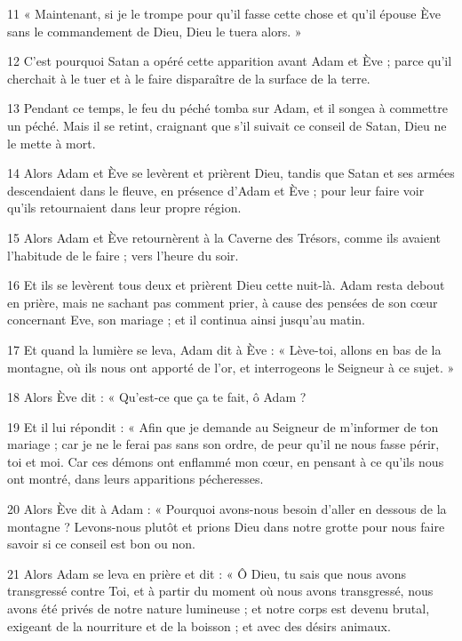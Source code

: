 \par 11 « Maintenant, si je le trompe pour qu'il fasse cette chose et qu'il épouse Ève sans le commandement de Dieu, Dieu le tuera alors. »

\par 12 C'est pourquoi Satan a opéré cette apparition avant Adam et Ève ; parce qu'il cherchait à le tuer et à le faire disparaître de la surface de la terre.

\par 13 Pendant ce temps, le feu du péché tomba sur Adam, et il songea à commettre un péché. Mais il se retint, craignant que s'il suivait ce conseil de Satan, Dieu ne le mette à mort.

\par 14 Alors Adam et Ève se levèrent et prièrent Dieu, tandis que Satan et ses armées descendaient dans le fleuve, en présence d'Adam et Ève ; pour leur faire voir qu'ils retournaient dans leur propre région.

\par 15 Alors Adam et Ève retournèrent à la Caverne des Trésors, comme ils avaient l'habitude de le faire ; vers l'heure du soir.

\par 16 Et ils se levèrent tous deux et prièrent Dieu cette nuit-là. Adam resta debout en prière, mais ne sachant pas comment prier, à cause des pensées de son cœur concernant Eve, son mariage ; et il continua ainsi jusqu'au matin.

\par 17 Et quand la lumière se leva, Adam dit à Ève : « Lève-toi, allons en bas de la montagne, où ils nous ont apporté de l'or, et interrogeons le Seigneur à ce sujet. »

\par 18 Alors Ève dit : « Qu'est-ce que ça te fait, ô Adam ?

\par 19 Et il lui répondit : « Afin que je demande au Seigneur de m'informer de ton mariage ; car je ne le ferai pas sans son ordre, de peur qu'il ne nous fasse périr, toi et moi. Car ces démons ont enflammé mon cœur, en pensant à ce qu’ils nous ont montré, dans leurs apparitions pécheresses.

\par 20 Alors Ève dit à Adam : « Pourquoi avons-nous besoin d'aller en dessous de la montagne ? Levons-nous plutôt et prions Dieu dans notre grotte pour nous faire savoir si ce conseil est bon ou non.

\par 21 Alors Adam se leva en prière et dit : « Ô Dieu, tu sais que nous avons transgressé contre Toi, et à partir du moment où nous avons transgressé, nous avons été privés de notre nature lumineuse ; et notre corps est devenu brutal, exigeant de la nourriture et de la boisson ; et avec des désirs animaux.

